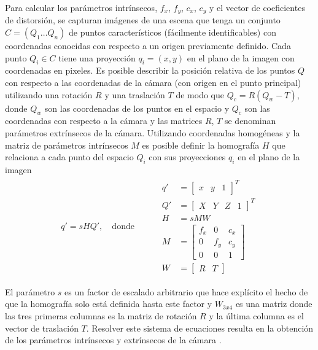 Para calcular los parámetros intrínsecos, $f_x$, $f_y$, $c_x$, $c_y$ y el vector de coeficientes de distorsión, se capturan imágenes de una escena que tenga un conjunto $C=(Q_1 \dots Q_n)$ de puntos característicos (fácilmente identificables) con coordenadas conocidas con respecto a un origen previamente definido. Cada punto $Q_i\in{C}$ tiene una proyección $q_i=(x, y)$ en el plano de la imagen con coordenadas en pixeles. Es posible describir la posición relativa de los puntos $Q$ con respecto a las coordenadas de la cámara (con origen en el punto principal) utilizando una rotación $R$ y una traslación $T$ de modo que $Q_c=R(Q_w-T)$, donde $Q_w$ son las coordenadas de los puntos en el espacio y $Q_c$ son las coordenadas con respecto a la cámara y las matrices $R$, $T$ se denominan parámetros extrínsecos de la cámara. Utilizando coordenadas homogéneas y la matriz de parámetros intrínsecos $M$ es posible definir la homografía $H$ que relaciona a cada punto del espacio $Q_i$ con sus proyecciones $q_i$ en el plano de la imagen \cite{DVD}
\begin{equation*}
    \begin{split}
        q'=sHQ',\quad\text{donde}\qquad &
        \begin{split}
            q' & = \begin{bmatrix}x&y&1\end{bmatrix}^T\\
            Q' & = \begin{bmatrix}X&Y&Z&1\end{bmatrix}^T\\
            H & = sMW\\
            M & = \begin{bmatrix}
	            f_x & 0 & c_x \\
	            0 & f_y & c_y \\
	            0 & 0 & 1
                \end{bmatrix}\\
            W & = \begin{bmatrix}R&T\end{bmatrix}
        \end{split}
    \end{split}
\end{equation*}

El parámetro $s$ es un factor de escalado arbitrario que hace explícito el hecho de que la homografía solo está definida hasta este factor y $W_{3x4}$ es una matriz donde las tres primeras columnas es la matriz de rotación $R$ y la última columna es el vector de traslación $T$. Resolver este sistema de ecuaciones resulta en la obtención de los parámetros intrínsecos y extrínsecos de la cámara \cite{DVD}.

